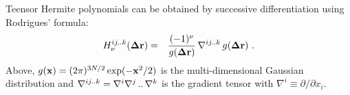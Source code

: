 \documentclass[prl,nofootinbib,twocolumn,floatfix,showpacs]{revtex4}
\begin{document}
Teensor Hermite polynomials can be
obtained by successive differentiation using Rodrigues' formula:
\begin{eqnarray}
\label{Rodrigues}
H_{\nu}^{ij..k}({\bf \Delta r}) &=& \frac{(-1)^\nu}{g({\bf
    \Delta r})}\,{\bf\nabla}^{ij..k}\,g({\bf \Delta r})\ .
\end{eqnarray}
Above, $g({\bf x}) = (2\pi)^{3N/2}\exp(-{\bf x}^2/2)$ is the
multi-dimen{\-}sional Gaussian distribution and ${\bf \nabla}^{ij..k} =
\nabla^i\nabla^j\,..\,\nabla^k$ is the gradient tensor with
$\nabla^i \equiv \partial/\partial x_i$.
\end{document}
